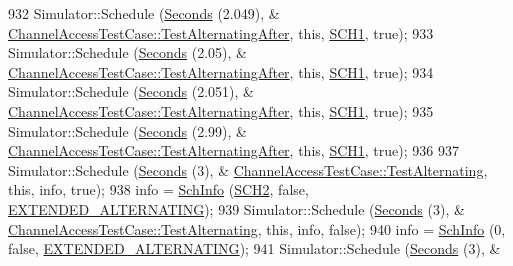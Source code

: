 \begin{DoxyCode}
932     Simulator::Schedule (\hyperlink{group__timecivil_ga33c34b816f8ff6628e33d5c8e9713b9e}{Seconds} (2.049), &
      \hyperlink{classChannelAccessTestCase_a1cddefa81cd70fd30ccdfe826ac4e85f}{ChannelAccessTestCase::TestAlternatingAfter}, \textcolor{keyword}{this}, 
      \hyperlink{channel-manager_8h_a456a1b730523e5d3b8a29fb227d10028}{SCH1}, \textcolor{keyword}{true});
933     Simulator::Schedule (\hyperlink{group__timecivil_ga33c34b816f8ff6628e33d5c8e9713b9e}{Seconds} (2.05), &
      \hyperlink{classChannelAccessTestCase_a1cddefa81cd70fd30ccdfe826ac4e85f}{ChannelAccessTestCase::TestAlternatingAfter}, \textcolor{keyword}{this}, 
      \hyperlink{channel-manager_8h_a456a1b730523e5d3b8a29fb227d10028}{SCH1}, \textcolor{keyword}{true});
934     Simulator::Schedule (\hyperlink{group__timecivil_ga33c34b816f8ff6628e33d5c8e9713b9e}{Seconds} (2.051), &
      \hyperlink{classChannelAccessTestCase_a1cddefa81cd70fd30ccdfe826ac4e85f}{ChannelAccessTestCase::TestAlternatingAfter}, \textcolor{keyword}{this}, 
      \hyperlink{channel-manager_8h_a456a1b730523e5d3b8a29fb227d10028}{SCH1}, \textcolor{keyword}{true});
935     Simulator::Schedule (\hyperlink{group__timecivil_ga33c34b816f8ff6628e33d5c8e9713b9e}{Seconds} (2.99), &
      \hyperlink{classChannelAccessTestCase_a1cddefa81cd70fd30ccdfe826ac4e85f}{ChannelAccessTestCase::TestAlternatingAfter}, \textcolor{keyword}{this}, 
      \hyperlink{channel-manager_8h_a456a1b730523e5d3b8a29fb227d10028}{SCH1}, \textcolor{keyword}{true});
936 
937     Simulator::Schedule (\hyperlink{group__timecivil_ga33c34b816f8ff6628e33d5c8e9713b9e}{Seconds} (3), &
      \hyperlink{classChannelAccessTestCase_a0a581ae6f9c8e9f1317bdcf7e0e95936}{ChannelAccessTestCase::TestAlternating}, \textcolor{keyword}{this}, info, \textcolor{keyword}{true});
938     info = \hyperlink{structns3_1_1SchInfo}{SchInfo} (\hyperlink{channel-manager_8h_a07a0bff852fe2b8538a46d6e779546b6}{SCH2}, \textcolor{keyword}{false}, \hyperlink{channel-scheduler_8h_a0e1f74c3cb8f78904dd1ae957412392e}{EXTENDED\_ALTERNATING});
939     Simulator::Schedule (\hyperlink{group__timecivil_ga33c34b816f8ff6628e33d5c8e9713b9e}{Seconds} (3), &
      \hyperlink{classChannelAccessTestCase_a0a581ae6f9c8e9f1317bdcf7e0e95936}{ChannelAccessTestCase::TestAlternating}, \textcolor{keyword}{this}, info, \textcolor{keyword}{false});
940     info = \hyperlink{structns3_1_1SchInfo}{SchInfo} (0, \textcolor{keyword}{false}, \hyperlink{channel-scheduler_8h_a0e1f74c3cb8f78904dd1ae957412392e}{EXTENDED\_ALTERNATING});
941     Simulator::Schedule (\hyperlink{group__timecivil_ga33c34b816f8ff6628e33d5c8e9713b9e}{Seconds} (3), &

\end{DoxyCode}
